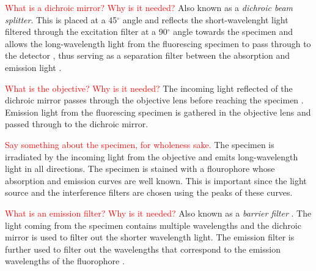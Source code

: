 \begin{definition}
	\textcolor{red}{What is a dichroic mirror? Why is it needed?}
	Also known as a \textit{dichroic beam splitter}.
	This is placed at a 45$^{\circ}$ angle and reflects the short-wavelenght light filtered through the excitation filter at a 90$^{\circ}$ angle towards the specimen \citep{Danek2012,Hubeny2008,Spring2003,CudeBurke2014} and allows the long-wavelength light from the fluorescing specimen to pass through to the detector \citep{LichtmanConchello2005,Koch1972}, thus serving as a separation filter between the absorption and emission light \citep{Fatima2008,Dobrucki2013}.
\end{definition}

\begin{definition}[Objective]
	\textcolor{red}{What is the objective? Why is it needed?}
	The incoming light reflected of the dichroic mirror passes through the objective lens before reaching the specimen \citep{Danek2012,Hubeny2008,LichtmanConchello2005,Spring2003}.
	Emission light from the fluorescing specimen is gathered in the objective lens and passed through to the dichroic mirror.
\end{definition}

\begin{definition}[Specimen]
	\textcolor{red}{Say something about the specimen, for wholeness sake.}
	The specimen is irradiated by the incoming light from the objective and emits long-wavelength light in all directions.
	The specimen is stained with a flourophore whose absorption and emission curves are well known.
	This is important since the light source and the interference filters are chosen using the peaks of these curves.
\end{definition}

\begin{definition}
	\textcolor{red}{What is an emission filter? Why is it needed?}
	Also known as a \textit{barrier filter} \citep{LichtmanConchello2005,Spring2003,Koch1972}.
	The light coming from the specimen contains multiple wavelengths and the dichroic mirror is used to filter out the shorter wavelength light.
	The emission filter is further  used to filter out the wavelengths that correspond to the emission wavelengths of the fluorophore \citep{CudeBurke2014,Danek2012,Hubeny2008,SpringDavisdson2016,ThermoFisher2016}.
\end{definition}


